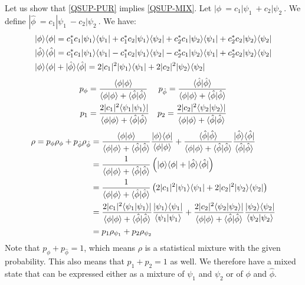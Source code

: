 \documentclass{article}
\begin{document}
\begin{demonstration}
	 Let us show that \ref{QSUP-PUR} implies \ref{QSUP-MIX}. Let $|\phi\> = c_1 |\psi_1\> + c_2 |\psi_2\>$. We define $|\hat{\phi}\> = c_1 |\psi_1\> - c_2 |\psi_2\>$. We have:
	\begin{equation}
		\begin{aligned}
			| \phi \rangle \langle \phi | &= c_1^* c_1 | \psi_1 \rangle \langle \psi_1 | + c_1^* c_2 | \psi_1 \rangle \langle \psi_2 | + c_2^* c_1 | \psi_2 \rangle \langle \psi_1 | + c_2^* c_2 | \psi_2 \rangle \langle \psi_2 | \\
			| \hat{\phi} \rangle \langle \hat{\phi} | &= c_1^* c_1 | \psi_1 \rangle \langle \psi_1 | - c_1^* c_2 | \psi_1 \rangle \langle \psi_2 | - c_2^* c_1 | \psi_2 \rangle \langle \psi_1 | + c_2^* c_2 | \psi_2 \rangle \langle \psi_2 | \\
			| \phi \rangle \langle \phi | &+ | \hat{\phi} \rangle \langle \hat{\phi} | = 2 |c_1|^2 | \psi_1 \rangle \langle \psi_1 | + 2 |c_2|^2 | \psi_2 \rangle \langle \psi_2 |
		\end{aligned}
	\end{equation}\begin{equation}
		\begin{aligned}
			p_{\phi} &= \frac{\langle\phi|\phi\rangle}{\langle\phi|\phi\rangle + \langle\hat{\phi}|\hat{\phi}\rangle} 
			&p_{\hat{\phi}} = \frac{\langle\hat{\phi}|\hat{\phi}\rangle}{\langle\phi|\phi\rangle + \langle\hat{\phi}|\hat{\phi}\rangle} \\
			p_{1} &= \frac{2 |c_1|^2 \langle \psi_1 | \psi_1 \rangle |}{\langle\phi|\phi\rangle + \langle\hat{\phi}|\hat{\phi}\rangle} 
			&p_{2} = \frac{2 |c_2|^2 \langle \psi_2 | \psi_2 \rangle |}{\langle\phi|\phi\rangle + \langle\hat{\phi}|\hat{\phi}\rangle}
		\end{aligned}
	\end{equation}
	\begin{equation}
		\begin{aligned}
			\rho = p_{\phi} \rho_{\phi} + p_{\hat{\phi}} \rho_{\hat{\phi}} &= \frac{\langle\phi|\phi\rangle}{\langle\phi|\phi\rangle + \langle\hat{\phi}|\hat{\phi}\rangle} \frac{| \phi \rangle \langle \phi |}{\langle \phi | \phi \rangle} + \frac{\langle\hat{\phi}|\hat{\phi}\rangle}{\langle\phi|\phi\rangle + \langle\hat{\phi}|\hat{\phi}\rangle} \frac{| \hat{\phi} \rangle \langle \hat{\phi} |}{\langle \hat{\phi} | \hat{\phi} \rangle} \\
			&=\frac{1}{\langle\phi|\phi\rangle + \langle\hat{\phi}|\hat{\phi}\rangle} \left(| \phi \rangle \langle \phi | + | \hat{\phi} \rangle \langle \hat{\phi} |\right) \\
			&=\frac{1}{\langle\phi|\phi\rangle + \langle\hat{\phi}|\hat{\phi}\rangle} \left(2 |c_1|^2 | \psi_1 \rangle \langle \psi_1 | + 2 |c_2|^2 | \psi_2 \rangle \langle \psi_2 |\right) \\
			&=\frac{2 |c_1|^2 \langle \psi_1 | \psi_1 \rangle |}{\langle\phi|\phi\rangle + \langle\hat{\phi}|\hat{\phi}\rangle} \frac{| \psi_1 \rangle \langle \psi_1 |}{\langle \psi_1 | \psi_1 \rangle} + \frac{2 |c_2|^2 \langle \psi_2 | \psi_2 \rangle |}{\langle\phi|\phi\rangle + \langle\hat{\phi}|\hat{\phi}\rangle} \frac{| \psi_2 \rangle \langle \psi_2 |}{\langle \psi_2 | \psi_2 \rangle} \\
			&=p_{1} \rho_{\psi_1} + p_{2} \rho_{\psi_2} \\
		\end{aligned}
	\end{equation}
	Note that $p_{\phi} + p_{\hat{\phi}}=1$, which means $\rho$ is a statistical mixture with the given probability. This also means that $p_1 + p_2 = 1$ as well. We therefore have a mixed state that can be expressed either as a mixture of $\psi_1$ and $\psi_2$ or of $\phi$ and $\hat{\phi}$.
	

\end{demonstration}
\end{document}
